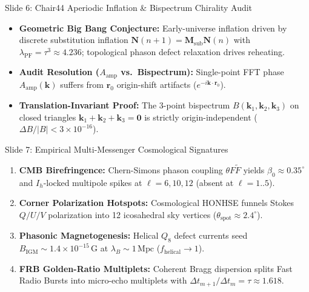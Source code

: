 \documentclass[aspectratio=169,10pt]{beamer}
\begin{document}
\begin{frame}{Slide 6: Chair44 Aperiodic Inflation \& Bispectrum Chirality Audit}
\begin{itemize}
\item \textbf{Geometric Big Bang Conjecture:} Early-universe inflation driven by discrete substitution inflation $\bm{N}(n+1) = \mathbf{M}_{\mathrm{sub}}\bm{N}(n)$ with $\lambda_{\mathrm{PF}} = \tau^3 \approx 4.236$; topological phason defect relaxation drives reheating.
\item \textbf{Audit Resolution ($A_{\mathrm{amp}}$ vs.\ Bispectrum):} Single-point FFT phase $A_{\mathrm{amp}}(\bm{k})$ suffers from $\bm{r}_0$ origin-shift artifacts ($e^{-i\bm{k}\cdot\bm{r}_0}$).
\item \textbf{Translation-Invariant Proof:} The 3-point bispectrum $B(\bm{k}_1,\bm{k}_2,\bm{k}_3)$ on closed triangles $\bm{k}_1+\bm{k}_2+\bm{k}_3=\bm{0}$ is strictly origin-independent ($\Delta B/|B| < 3\times 10^{-16}$).
\end{itemize}
\end{frame}

\begin{frame}{Slide 7: Empirical Multi-Messenger Cosmological Signatures}
\begin{enumerate}
\item \textbf{CMB Birefringence:} Chern-Simons phason coupling $\theta F\tilde{F}$ yields $\beta_0 \approx 0.35^\circ$ and $I_h$-locked multipole spikes at $\ell = 6, 10, 12$ (absent at $\ell=1..5$).
\item \textbf{Corner Polarization Hotspots:} Cosmological HONHSE funnels Stokes $Q/U/V$ polarization into 12 icosahedral sky vertices ($\theta_{\mathrm{spot}} \approx 2.4^\circ$).
\item \textbf{Phasonic Magnetogenesis:} Helical $Q_8$ defect currents seed $B_{\mathrm{IGM}} \sim 1.4 \times 10^{-15}\,\mathrm{G}$ at $\lambda_B \sim 1\,\mathrm{Mpc}$ ($f_{\mathrm{helical}} \to 1$).
\item \textbf{FRB Golden-Ratio Multiplets:} Coherent Bragg dispersion splits Fast Radio Bursts into micro-echo multiplets with $\Delta t_{m+1}/\Delta t_m = \tau \approx 1.618$.
\end{enumerate}
\end{frame}
\end{document}
